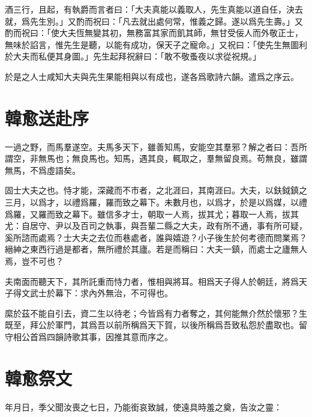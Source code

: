 酒三行，且起，有執爵而言者曰：「大夫真能以義取人，先生真能以道自任，決去就，爲先生別。」又酌而祝曰：「凡去就出處何常，惟義之歸。遂以爲先生壽。」又酌而祝曰：「使大夫恆無變其初，無務富其家而飢其師，無甘受佞人而外敬正士，無{味}於諂言，惟先生是聽，以能有成功，保天子之寵命。」又祝曰：「使先生無圖利於大夫而私便其身圖。」先生起拜祝辭曰：「敢不敬蚤夜以求從祝規。」

於是之人士咸知大夫與先生果能相與以有成也，遂各爲歌詩六韻。遣爲之序云。

\theendnotes

\section[送溫處士赴河陽軍序\quad{\small 韓愈}]{{\normalsize 韓愈}\quad 送赴序}
一過之野，而馬羣遂空。夫馬多天下，雖善知馬，安能空其羣邪？解之者曰：吾所謂空，非無馬也；無良馬也。知馬，遇其良，輒取之，羣無留良焉。苟無良，雖謂無馬，不爲虛語矣。

固士大夫之也。恃才能，深藏而不市者，之北涯曰，其南涯曰。大夫，以鈇鉞鎮之三月，以爲才，以禮爲羅，羅而致之幕下。未數月也，以爲才，於是以爲媒，以禮爲羅，又羅而致之幕下。雖信多才士，朝取一人焉，拔其尤；暮取一人焉，拔其尤：自居守、尹以及百司之執事，與吾輩二縣之大夫，政有所不通，事有所可疑，奚所諮而處焉？士大夫之去位而巷處者，誰與嬉遊？小子後生於何考德而問業焉？縉紳之東西行過是都者，無所禮於其廬。若是而稱曰：大夫一鎮，而處士之廬無人焉，豈不可也？

夫南面而聽天下，其所託重而恃力者，惟相與將耳。相爲天子得人於朝廷，將爲天子得文武士於幕下：求內外無治，不可得也。

縻於茲不能自引去，資二生以待老；今皆爲有力者奪之，其何能無介然於懷邪？生既至，拜公於軍門，其爲吾以前所稱爲天下賀，以後所稱爲吾致私怨於盡取也。留守相公首爲四韻詩歌其事，因推其意而序之。

\section[祭十二郎文\quad{\small 韓愈}]{{\normalsize 韓愈}\quad 祭文}
{\parindent=0pt 年月日，季父聞汝喪之七日，乃能銜哀致誠，使遠具時羞之奠，告汝之靈：}

